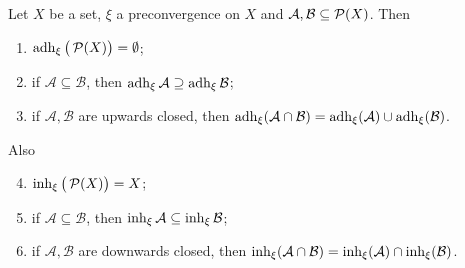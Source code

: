 \begin{proposition}
Let $X$ be a set, $\xi$ a preconvergence on $X$ and $\mathcal{A},\mathcal{B} \subseteq \operatorname{\mathcal{P}}(X)$. Then
\begin{enumerate}
\item $\operatorname{adh}_\xi \big(\operatorname{\mathcal{P}}(X)\big) = \emptyset$;
\item if $\mathcal{A} \subseteq \mathcal{B}$, then $\operatorname{adh}_\xi \mathcal{A} \supseteq \operatorname{adh}_\xi \mathcal{B}$;
\item if $\mathcal{A},\mathcal{B}$ are upwards closed, then $\operatorname{adh}_\xi(\mathcal{A}\cap \mathcal{B}) = \operatorname{adh}_\xi(\mathcal{A}) \cup \operatorname{adh}_\xi(\mathcal{B})$.
\end{enumerate}
Also
\begin{enumerate} \setcounter{enumi}{3}
\item $\operatorname{inh}_\xi\big(\operatorname{\mathcal{P}}(X)\big) = X$;
\item if $\mathcal{A} \subseteq \mathcal{B}$, then $\operatorname{inh}_\xi \mathcal{A} \subseteq \operatorname{inh}_\xi \mathcal{B}$;
\item if $\mathcal{A},\mathcal{B}$ are downwards closed, then $\operatorname{inh}_\xi(\mathcal{A}\cap \mathcal{B}) = \operatorname{inh}_\xi(\mathcal{A}) \cap \operatorname{inh}_\xi(\mathcal{B})$.
\end{enumerate}
\end{proposition}
